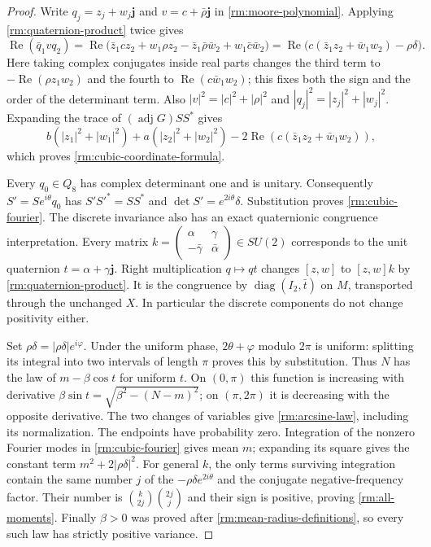 \begin{proof}
Write $q_j=z_j+w_j\mathbf j$ and $v=c+\bar\rho\mathbf j$ in
\eqref{rm:moore-polynomial}. Applying \eqref{rm:quaternion-product}
twice gives
\[
 \operatorname{Re}(\bar q_1vq_2)
 =\operatorname{Re}\bigl(
  \bar z_1cz_2+w_1\rho z_2
        -\bar z_1\bar\rho\bar w_2+w_1\bar c\bar w_2\bigr)
 =\operatorname{Re}\bigl(c(\bar z_1z_2+\bar w_1w_2)-\rho\delta\bigr).
\]
Here taking complex conjugates inside real parts changes the third
term to $-\operatorname{Re}(\rho z_1w_2)$ and the fourth to
$\operatorname{Re}(c\bar w_1w_2)$; this fixes both the sign and the
order of the determinant term. Also $|v|^2=|c|^2+|\rho|^2$ and
$|q_j|^2=|z_j|^2+|w_j|^2$. Expanding the trace of
$(\operatorname{adj}G)SS^*$ gives
\[
 b(|z_1|^2+|w_1|^2)+a(|z_2|^2+|w_2|^2)
             -2\operatorname{Re}(c(\bar z_1z_2+\bar w_1w_2)),
\]
which proves \eqref{rm:cubic-coordinate-formula}.

Every $q_0\in Q_8$ has complex determinant one and is unitary.
Consequently $S'=Se^{i\theta}q_0$ has
$S'S'^*=SS^*$ and $\det S'=e^{2i\theta}\delta$. Substitution proves
\eqref{rm:cubic-fourier}. The discrete invariance also has an exact
quaternionic congruence interpretation. Every matrix
$k=\left(\begin{smallmatrix}\alpha&\gamma\\-\bar\gamma&\bar\alpha
\end{smallmatrix}\right)\in SU(2)$ corresponds to the unit quaternion
$t=\alpha+\gamma\mathbf j$. Right multiplication $q\mapsto qt$
changes $[z,w]$ to $[z,w]k$ by \eqref{rm:quaternion-product}.
It is the congruence by $\operatorname{diag}(I_2,\bar t)$ on $M$,
transported through the unchanged $X$. In particular the discrete
components do not change positivity either.

Set $\rho\delta=|\rho\delta|e^{i\varphi}$. Under the uniform phase,
$2\theta+\varphi$ modulo $2\pi$ is uniform: splitting its integral
into two intervals of length $\pi$ proves this by substitution.
Thus $N$ has the law of $m-\beta\cos t$ for uniform $t$.
On $(0,\pi)$ this function is increasing with derivative
$\beta\sin t=\sqrt{\beta^2-(N-m)^2}$; on $(\pi,2\pi)$ it is
decreasing with the opposite derivative. The two changes of variables
give \eqref{rm:arcsine-law}, including its normalization. The endpoints
have probability zero. Integration of the nonzero Fourier modes in
\eqref{rm:cubic-fourier} gives mean $m$; expanding its square gives
the constant term $m^2+2|\rho\delta|^2$. For general $k$, the only
terms surviving integration contain the same number $j$ of the
$-\rho\delta e^{2i\theta}$ and the conjugate negative-frequency
factor. Their number is $\binom{k}{2j}\binom{2j}{j}$ and their sign
is positive, proving \eqref{rm:all-moments}. Finally $\beta>0$ was
proved after \eqref{rm:mean-radius-definitions}, so every such law
has strictly positive variance.
\end{proof}

